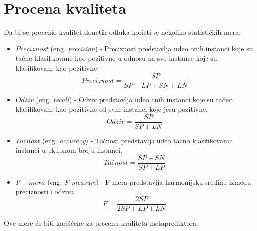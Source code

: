 \section{Procena kvaliteta}
Da bi se procenio kvalitet donetih odluka koristi se nekoliko statističkih mera:
\begin{itemize}
\item $Preciznost$ (eng. \textit{precision}) - Preciznost predstavlja udeo onih instanci koje su tačno klasifikovane kao pozitivne u odnosu na sve instance koje su klasifikovane kao pozitivne. 
$$Preciznost = \frac{SP}{SP + LP + SN + LN}$$
\item $Odziv$ (eng.  \textit{recall}) - Odziv predstavlja udeo onih instanci koje su tačno klasifikovane kao pozitivne od svih instanci koje jesu pozitivne.
$$Odziv = \frac{SP}{SP + LN}$$
\item $Ta\text{č}nost$ (eng. \textit{accuracy}) - Tačnost predstavlja udeo tačno klasifikovanih instanci u ukupnom broju instanci.
$$Ta\text{č}nost = \frac{SP + SN}{SP + LP}$$
\item $F-mera$ (eng. \textit{F-measure}) - F-mera predstavlja harmonijsku sredinu između preciznosti i odziva. 
$$F = \frac{2SP}{2SP + LP + LN}$$
\end{itemize} 
Ove mere će biti korišćene za procenu kvaliteta metaprediktora.

